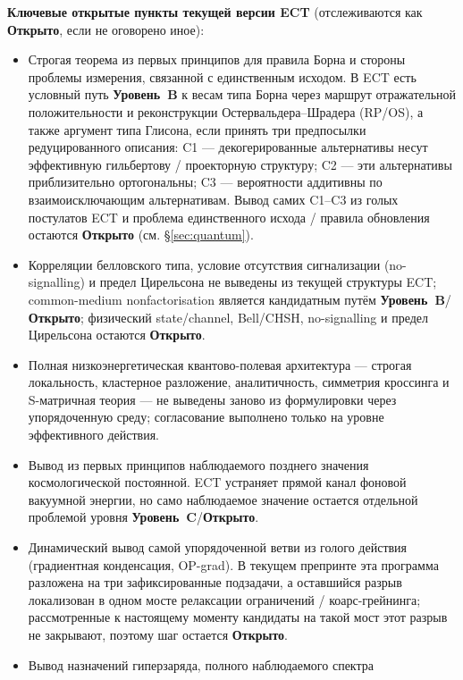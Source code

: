 \documentclass[11pt,a4paper]{article}
\newcommand{\statB}{\textbf{Уровень~B}}
\newcommand{\statC}{\textbf{Уровень~C}}
\newcommand{\statO}{\textbf{Открыто}}
\begin{document}
\textbf{Ключевые открытые пункты текущей версии ECT}
(отслеживаются как \statO{}, если не оговорено иное):

\begin{itemize}[leftmargin=1.4em,itemsep=2pt]
\item Строгая теорема из первых принципов для правила Борна и
      стороны проблемы измерения, связанной с единственным
      исходом. В ECT есть условный путь \statB{} к весам типа
      Борна через маршрут отражательной положительности и
      реконструкции Остервальдера--Шрадера (RP/OS), а также
      аргумент типа Глисона, если принять три предпосылки
      редуцированного
      описания: C1 — декогерированные альтернативы несут
      эффективную гильбертову / проекторную структуру; C2 — эти
      альтернативы приблизительно ортогональны; C3 — вероятности
      аддитивны по взаимоисключающим альтернативам.
      Вывод самих C1--C3 из голых постулатов ECT и проблема
      единственного исхода / правила обновления остаются \statO{}
      (см. \S\ref{sec:quantum}).
\item Корреляции белловского типа, условие отсутствия сигнализации
      (no-signalling) и предел
      Цирельсона не выведены из текущей структуры ECT;
      common-medium nonfactorisation является кандидатным путём
      \statB{}/\statO{}; физический state/channel, Bell/CHSH,
      no-signalling и предел Цирельсона остаются \statO.
\item Полная низкоэнергетическая квантово-полевая архитектура —
      строгая локальность, кластерное разложение, аналитичность,
      симметрия кроссинга и S-матричная теория — не выведены
      заново из
      формулировки через упорядоченную среду; согласование
      выполнено только на уровне эффективного действия.
\item Вывод из первых принципов наблюдаемого позднего значения
      космологической постоянной. ECT устраняет прямой канал
      фоновой вакуумной энергии, но само наблюдаемое значение
      остается отдельной проблемой уровня \statC/\statO{}.
\item Динамический вывод самой упорядоченной ветви из голого
      действия (градиентная конденсация, OP-grad). В текущем
      препринте эта программа разложена на три зафиксированные
      подзадачи, а оставшийся разрыв локализован в одном мосте
      релаксации ограничений / коарс-грейнинга; рассмотренные к
      настоящему моменту кандидаты на такой мост этот разрыв не
      закрывают, поэтому шаг остается \statO.
\item Вывод назначений гиперзаряда, полного наблюдаемого спектра

\end{itemize}
\end{document}

